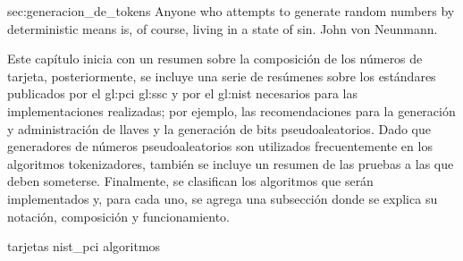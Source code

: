 %
%
%

{sec:generacion_de_tokens}
{
  \epigrafe
  {%
    Anyone who attempts to generate random numbers by deterministic means is, of
    course, living in a state of sin.%
  }
  {%
    John von Neunmann.%
  }
}

\noindent
Este capítulo inicia con un resumen sobre la composición de los números de
tarjeta, posteriormente, se incluye una serie de resúmenes sobre los estándares
publicados por el \gls{gl:pci} \gls{gl:ssc} y por el \gls{gl:nist} necesarios
para las implementaciones realizadas; por ejemplo, las recomendaciones para la
generación y administración de llaves y la generación de bits pseudoaleatorios.
Dado que generadores de números pseudoaleatorios son utilizados frecuentemente
en los algoritmos tokenizadores, también se incluye un resumen de las pruebas a
las que deben someterse. Finalmente, se clasifican los algoritmos que serán
implementados y, para cada uno, se agrega una subsección donde se explica su
notación, composición y funcionamiento.

{tarjetas}
{nist_pci}
{algoritmos}
